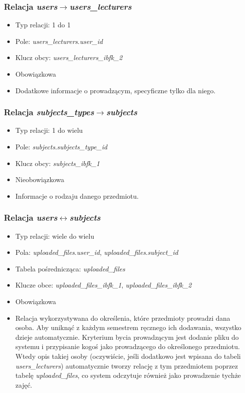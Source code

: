 \documentclass[a4paper,12pt,oneside]{report}
\begin{document}
\subsubsection{Relacja \emph{users}$\to$\emph{users\_lecturers}}
\label{subsub:users-users_lecturers}
\begin{itemize}
  \item Typ relacji: 1 do 1
  \item Pole: \emph{users\_lecturers}.\emph{user\_id}
  \item Klucz obcy: \emph{users\_lecturers\_ibfk\_2}
  \item Obowiązkowa
  \item Dodatkowe informacje o prowadzącym, specyficzne tylko dla niego.
\end{itemize}

\subsubsection{Relacja \emph{subjects\_types}$\to$\emph{subjects}}
\label{subsub:subjects_types-subjects}
\begin{itemize}
  \item Typ relacji: 1 do wielu
  \item Pole: \emph{subjects}.\emph{subjects\_type\_id}
  \item Klucz obcy: \emph{subjects\_ibfk\_1}
  \item Nieobowiązkowa
  \item Informacje o rodzaju danego przedmiotu.
\end{itemize}

\subsubsection{Relacja \emph{users}$\leftrightarrow$\emph{subjects}}
\label{subsub:users-subjects}
\begin{itemize}
  \item Typ relacji: wiele do wielu
  \item Pola: \emph{uploaded\_files}.\emph{user\_id}, \emph{uploaded\_files}.\emph{subject\_id}
  \item Tabela pośrednicząca: \emph{uploaded\_files}
  \item Klucze obce: \emph{uploaded\_files\_ibfk\_1}, \emph{uploaded\_files\_ibfk\_2}
  \item Obowiązkowa
  \item Relacja wykorzystywana do określenia, które przedmioty prowadzi dana osoba. Aby uniknąć z każdym semestrem ręcznego ich dodawania, wszystko dzieje automatycznie. Kryterium bycia prowadzącym jest dodanie pliku do systemu i przypisanie kogoś jako prowadzącego do określonego przedmiotu. Wtedy opis takiej osoby (oczywiście, jeśli dodatkowo jest wpisana do tabeli \emph{users\_lecturers}) automatycznie tworzy relację z tym przedmiotem poprzez tabelę \emph{uploaded\_files}, co system odczytuje również jako prowadzenie tychże zajęć.
\end{itemize}
\end{document}
